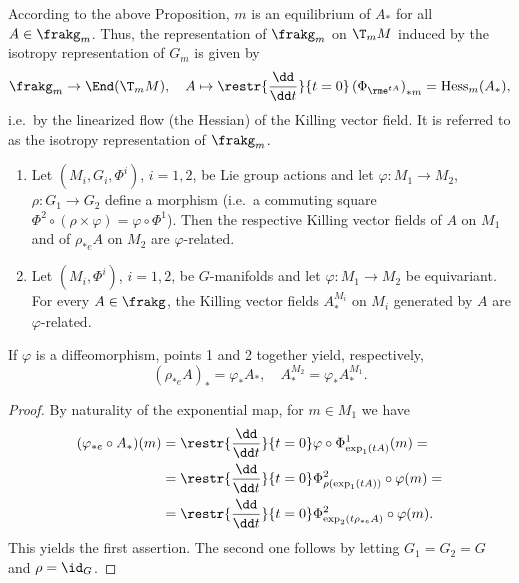 \begin{rem}
    According to the above Proposition, $m$ is an equilibrium of $A_\ast$ for all $A\in\frakg_m$. Thus, the representation of $\frakg_m$ on $\T_mM$ induced by the isotropy representation of $G_m$ is given by
    \[\frakg_m\to \End(\T_mM),\quad A\mapsto \restr{\frac{\dd}{\dd t}}{t=0} \left(\Phi_{\rme^{tA}}\right)_{\ast m}=\mathrm{Hess}_m(A_\ast),\]
    i.e.~by the linearized flow (the Hessian) of the Killing vector field. It is referred to as the isotropy representation of $\frakg_m$.
\end{rem}

\begin{prop}\label{prop 6.2.4 RS1}
    \begin{enumerate}
        \item Let $(M_i,G_i,\Phi^i)$, $i=1,2$, be Lie group actions and let $\varphi:M_1\to M_2$, $\rho:G_1\to G_2$ define a morphism (i.e.~a commuting square $\Phi^2\circ(\rho\times\varphi)=\varphi\circ\Phi^1$). Then the respective Killing vector fields of $A$ on $M_1$ and of $\rho_{\ast e} A$ on $M_2$ are $\varphi$-related.
        \item Let $(M_i,\Phi^i)$, $i=1,2$, be $G$-manifolds and let $\varphi:M_1\to M_2$ be equivariant. For every $A\in\frakg$, the Killing vector fields $A_\ast^{M_i}$ on $M_i$ generated by $A$ are $\varphi$-related.
    \end{enumerate}
    If $\varphi$ is a diffeomorphism, points 1 and 2 together yield, respectively,
    \[\left(\rho_{\ast e}A\right)_\ast=\varphi_{\ast}A_\ast,\quad A_\ast^{M_2}=\varphi_\ast A_\ast^{M_1}.\]
\end{prop}
\begin{proof}
    By naturality of the exponential map, for $m\in M_1$ we have
    \begin{align}
        (\varphi_{\ast e}\circ A_\ast)(m)&=\restr{\frac{\dd}{\dd t}}{t=0} \varphi\circ \Phi^1_{\exp_1(tA)}(m)=\notag\\
        &=\restr{\frac{\dd}{\dd t}}{t=0} \Phi^2_{\rho(\exp_1(tA))}\circ\varphi(m)=\notag\\
        &=\restr{\frac{\dd}{\dd t}}{t=0}\Phi^2_{\exp_2(t\rho_{\ast e}A)}\circ\varphi(m).
    \end{align}
    This yields the first assertion. The second one follows by letting $G_1=G_2=G$ and $\rho=\id_G$.
\end{proof}

